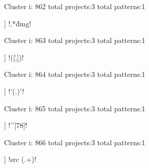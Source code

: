 Cluster i: 862
total projects:3
total patterns:1
\begin{multicols}{1}
\begin{description}[noitemsep,topsep=0pt]
\item [[3] ] \cverb!.*\.dmg!
\end{description}
\end{multicols}







Cluster i: 863
total projects:3
total patterns:1
\begin{multicols}{1}
\begin{description}[noitemsep,topsep=0pt]
\item [[3] ] \cverb!([\.,])!
\end{description}
\end{multicols}







Cluster i: 864
total projects:3
total patterns:1
\begin{multicols}{1}
\begin{description}[noitemsep,topsep=0pt]
\item [[3] ] \cverb!'\?(.)'!
\end{description}
\end{multicols}







Cluster i: 865
total projects:3
total patterns:1
\begin{multicols}{1}
\begin{description}[noitemsep,topsep=0pt]
\item [[3] ] \cverb!^[78]\.!
\end{description}
\end{multicols}







Cluster i: 866
total projects:3
total patterns:1
\begin{multicols}{1}
\begin{description}[noitemsep,topsep=0pt]
\item [[3] ] \cverb!src (.+)!
\end{description}
\end{multicols}







